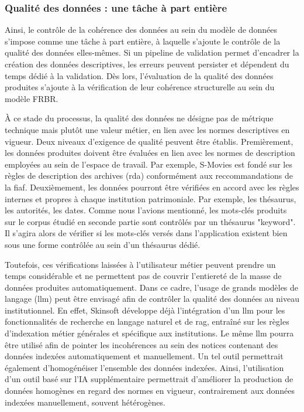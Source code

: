 \subsubsection{Qualité des données : une tâche à part entière}

Ainsi, le contrôle de la cohérence des données au sein du modèle de données s'impose comme une tâche à part entière, à laquelle s'ajoute le contrôle de la qualité des données elles-mêmes. Si un pipeline de validation permet d'encadrer la création des données descriptives, les erreurs peuvent persister et dépendent du temps dédié à la validation. Dès lors, l'évaluation de la qualité des données produites s'ajoute à la vérification de leur cohérence structurelle au sein du modèle FRBR. 

À ce stade du processus, la qualité des données ne désigne pas de métrique technique mais plutôt une valeur métier, en lien avec les normes descriptives en vigueur. Deux niveaux d'exigence de qualité peuvent être établis. Premièrement, les données produites doivent être évaluées en lien avec les normes de description employées au sein de l'espace de travail. Par exemple, S-Movies est fondé sur les règles de description des archives (\gls{rda}) conformément aux reccommandations de la \gls{fiaf}. Deuxièmement, les données pourront être vérifiées en accord avec les règles internes et propres à chaque institution patrimoniale. Par exemple, les thésaurus, les autorités, les dates. Comme nous l'avions mentionné, les mots-clés produits sur le corpus étudié en seconde partie sont contrôlés par un thésaurus "keyword". Il s'agira alors de vérifier si les mots-clés versés dans l'application existent bien sous une forme contrôlée au sein d'un thésaurus dédié. 

Toutefois, ces vérifications laissées à l'utilisateur métier peuvent prendre un temps considérable et ne permettent pas de couvrir l'entiereté de la masse de données produites automatiquement. Dans ce cadre, l'usage de grands modèles de langage (\gls{llm}) peut être envisagé afin de contrôler la qualité des données au niveau institutionnel. En effet, Skinsoft développe déjà l'intégration d'un \gls{llm} pour les fonctionnalités de recherche en langage naturel et de \gls{rag}, entraîné sur les règles d'indexation métier générales et spécifique aux institutions. Le même \gls{llm} pourra être utilisé afin de pointer les incohérences au sein des notices contenant des données indexées automatiquement et manuellement. Un tel outil permettrait également d'homogénéiser l'ensemble des données indexées. Ainsi, l'utilisation d'un outil basé sur l'IA supplémentaire permettrait d'améliorer la production de données homogènes en regard des normes en vigueur, contrairement aux données indexées manuellement, souvent hétérogènes.  


